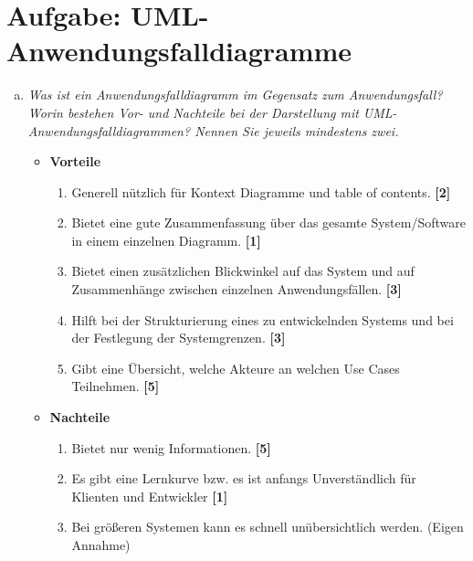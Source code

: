 \section{Aufgabe: UML-Anwendungsfalldiagramme}
\begin{enumerate}[a)]
    \item {\itshape Was ist ein Anwendungsfalldiagramm im Gegensatz zum Anwendungsfall? Worin bestehen Vor- und Nachteile bei der Darstellung mit UML-Anwendungsfalldiagrammen? Nennen Sie jeweils mindestens zwei.}
    \begin{itemize}
        Ein Anwendungsfalldiagramm visualisiert die Zusammenhänge und Beziehungen zwischen einer Menge von Use Cases und den involvierten Akteuren. \textbf{[3]} Sie beschreiben die Funktionalität, die zu erbringenden Dienste und Leistungen, aus Anwendersicht. \textbf{[8]} Damit eignet es sich sehr gut zur Anforderungsanalyse, also zur Ermittlung oder Verfeinerung von Anforderungen und bieten einen sehr guten Überblick über das Gesamtsystem \textbf{[3][8]}
        
        \item \textbf{Vorteile}
        \begin{enumerate}[1.]
            \item Generell nützlich für Kontext Diagramme und table of contents. \textbf{[2]}
            
            \item Bietet eine gute Zusammenfassung über das gesamte System/Software in einem einzelnen Diagramm. \textbf{[1]}
            
            \item Bietet einen zusätzlichen Blickwinkel auf das System und auf Zusammenhänge zwischen einzelnen Anwendungsfällen. \textbf{[3]}
            
            \item Hilft bei der Strukturierung eines zu entwickelnden Systems und bei der Festlegung der Systemgrenzen. \textbf{[3]}
            
            \item Gibt eine Übersicht, welche Akteure an welchen Use Cases Teilnehmen. \textbf{[5]}
        \end{enumerate}
        
        \item \textbf{Nachteile}
        \begin{enumerate}[1.]
            \item Bietet nur wenig Informationen. \textbf{[5]}
            \item Es gibt eine Lernkurve bzw. es ist anfangs Unverständlich für Klienten und Entwickler \textbf{[1]}
            \item Bei größeren Systemen kann es schnell unübersichtlich werden. (Eigen Annahme)
        \end{enumerate}


\end{itemize}
\end{enumerate}
